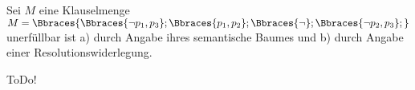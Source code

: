 
\begin{exercise}[46]

Sei $M$ eine Klauselmenge $M = \Bbraces{\Bbraces{\neg p_1, p_3}; \Bbraces{p_1, p_2}; \Bbraces{\neg}; \Bbraces{\neg p_2, p_3};}$ unerfüllbar ist
a) durch Angabe ihres semantische Baumes und
b) durch Angabe einer Resolutionswiderlegung.

\end{exercise}


\begin{solution}

ToDo!

\end{solution}

